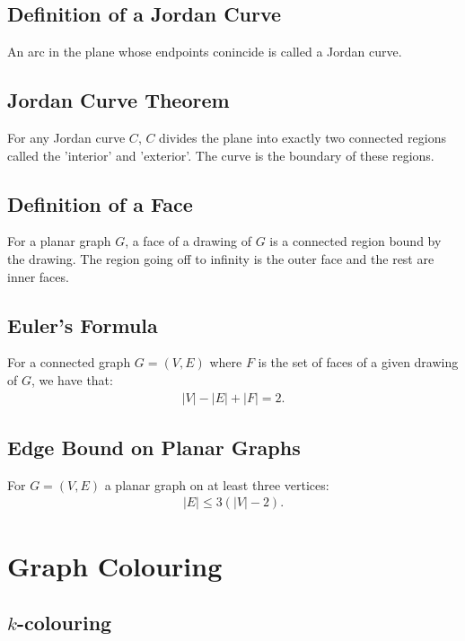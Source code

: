 \documentclass[a4paper, 12pt, twoside]{article}
\begin{document}
\subsection{Definition of a Jordan Curve}

An arc in the plane whose endpoints conincide is called a Jordan curve.

\subsection{Jordan Curve Theorem}

For any Jordan curve $C$, $C$ divides the plane into exactly two connected regions
called the 'interior' and 'exterior'. The curve is the boundary of these regions. 

\subsection{Definition of a Face}

For a planar graph $G$, a face of a drawing of $G$ is a connected region
bound by the drawing. The region going off to infinity is the outer face and
the rest are inner faces.

\subsection{Euler's Formula}

For a connected graph $G = (V, E)$ where $F$ is the set of faces of a given 
drawing of $G$, we have that: \begin{gather*}
  |V| - |E| + |F| = 2.
\end{gather*}

\subsection{Edge Bound on Planar Graphs}

For $G = (V, E)$ a planar graph on at least three vertices: \begin{gather*}
  |E| \leq 3(|V| - 2).
\end{gather*}

\section{Graph Colouring}

\subsection{$k$-colouring}
\end{document}
